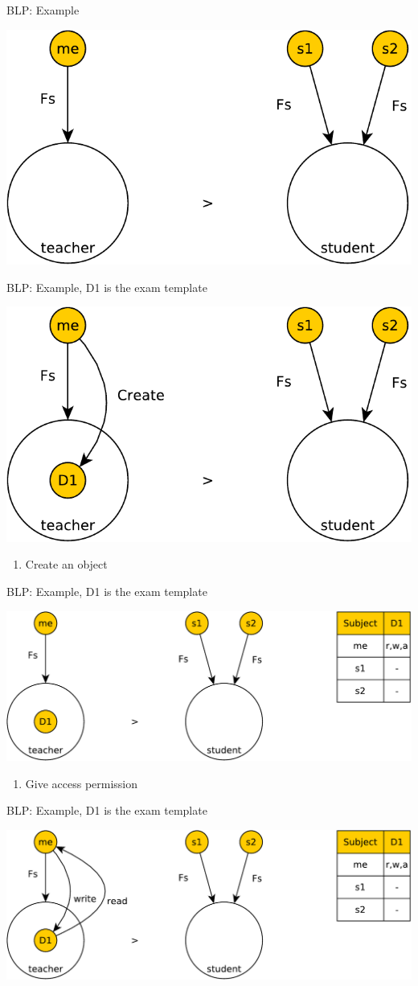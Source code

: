 \documentclass{beamer}
\begin{document}
\begin{frame}[t]{BLP: Example}
  \begin{center}
    \includegraphics[width=0.5\linewidth]{ex1}
  \end{center}
\end{frame}
\begin{frame}[t]{BLP: Example, D1 is the exam template}
  \begin{center}
    \includegraphics[width=0.5\linewidth]{ex2}
  \end{center}
\begin{enumerate}
  \item Create an object
\end{enumerate}
\end{frame}
\begin{frame}[t]{BLP: Example, D1 is the exam template}
  \begin{center}
    \includegraphics[width=0.8\linewidth]{ex3}
  \end{center}
\begin{enumerate}
  \item Give access permission
\end{enumerate}
\end{frame}
\begin{frame}[t]{BLP: Example, D1 is the exam template}
  \begin{center}
    \includegraphics[width=0.8\linewidth]{ex4}
  \end{center}
\end{frame}
\end{document}
